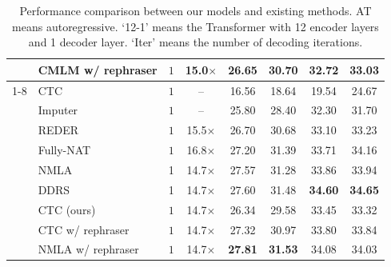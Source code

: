 \documentclass[letterpaper]{article} %
\begin{document}
\begin{table}[th!]
\begin{tabular}{clcccccc}
& CMLM w/ rephraser &$1$&15.0$\times$&\bf{26.65} &\bf{30.70}& \bf{32.72}&33.03 \\
\cmidrule[0.6pt](lr){1-8}
\multirow{9}{*}{CTC}
& CTC \cite{libovicky2018end}  &$1$&--& 16.56 & 18.64 & 19.54 & 24.67  \\
& Imputer \cite{saharia-etal-2020-non}  &$1$&--& 25.80 & 28.40 & 32.30 & 31.70 \\
& REDER \cite{zheng2021duplex}  &$1$&15.5$\times$&26.70 & 30.68 & 33.10 & 33.23\\
& Fully-NAT \cite{gu2020fully}  &$1$&16.8$\times$& 27.20 & 31.39 & 33.71 & 34.16\\
& NMLA \cite{nmla}& 1 & 14.7$\times$& 27.57 & 31.28 & 33.86 & 33.94\\
& DDRS \cite{shao-etal-2022-one}& 1 & 14.7$\times$&27.60&31.48&\bf{34.60}&\bf{34.65}\\
& CTC (ours) &$1$&14.7$\times$&26.34 & 29.58 & 33.45 & 33.32\\
& CTC w/ rephraser &$1$&14.7$\times$& 27.32& 30.97&33.80 &33.84 \\
& NMLA w/ rephraser &$1$&14.7$\times$& \bf{27.81}& \bf{31.53}&34.08 &34.03 \\
\bottomrule
\end{tabular}
\caption{Performance comparison between our models and existing methods. AT means autoregressive. `12-1' means the Transformer with 12 encoder layers and 1 decoder layer. `Iter' means the number of decoding iterations.}
\label{tab:main-rst}
\end{table}
\end{document}
